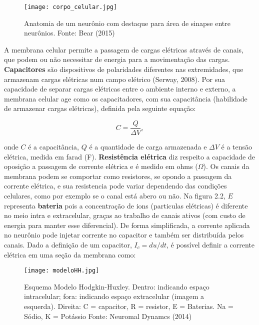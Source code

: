 \begin{figure}
    \centering
    \texttt{[image: corpo\_celular.jpg]}
    \caption{Anatomia de um neurônio com destaque para área de sinapse entre neurônios. Fonte: Bear (2015)}
\end{figure}

A membrana celular permite a passagem de cargas elétricas através de canais, que podem ou não necessitar de energia para a movimentação
das cargas. \textbf{Capacitores} são dispositivos de polaridades diferentes nas extremidades, que armazenam
cargas elétricas num campo elétrico (Serway, 2008). Por sua capacidade de separar cargas elétricas entre o ambiente interno e externo, 
a membrana celular age como os capacitadores, com sua capacitância (habilidade de armazenar cargas elétricas), definida pela seguinte equação:

\begin{equation}
    C = \frac{Q}{\Delta V},
\end{equation}

onde $C$ é a capacitância, $Q$ é a quantidade de carga armazenada e $\Delta V$ é a tensão elétrica, medida em farad (F). 
\textbf{Resistência elétrica} diz respeito a capacidade de oposição a passagem de corrente elétrica e é medido em
 ohms ($\Omega$). Os canais da membrana podem se comportar como resistores, se opondo a passagem da corrente elétrica, e sua 
 resistencia pode variar dependendo das condições celulares, como por exemplo se o canal está abero ou  não. Na figura 2.2, $E$ representa
 \textbf{bateria} pois a concentração de ions (particulas elétricas) é diferente no meio intra e extracelular, graças ao trabalho de canais ativos (com custo de energia
 para manter esse diferencial). De forma simplificada, a corrente aplicada no neurônio pode injetar corrente no capacitor e também 
 ser distribuída pelos canais. Dado a definição de um capacitor, $I_c = d u /d t$, é possível definir a corrente elétrica em uma seção da 
 membrana como:


\begin{figure}
    \centering
    \texttt{[image: modeloHH.jpg]}
    \caption{Esquema Modelo Hodgkin-Huxley. 
    Dentro: indicando espaço intracelular; fora: indicando espaço extracelular (imagem a esquerda). Direita: 
    C = capacitor, R = resistor, E = Baterias. Na = Sódio, K = Potássio  Fonte: Neuromal Dynamcs (2014)} 
\end{figure}

